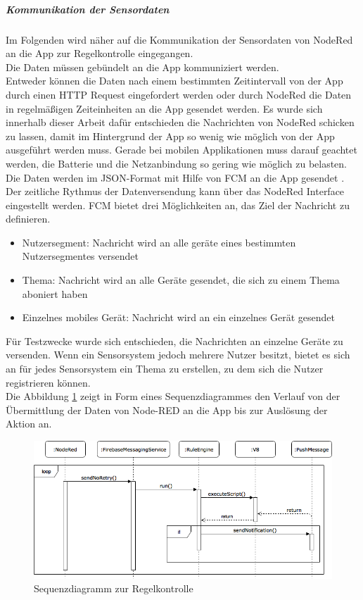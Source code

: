 \subparagraph{Kommunikation der Sensordaten}
Im Folgenden wird näher auf die Kommunikation der Sensordaten von NodeRed an die App zur Regelkontrolle eingegangen.\\
Die Daten müssen gebündelt an die App kommuniziert werden.\\
Entweder können die Daten nach einem bestimmten Zeitintervall von der App durch einen HTTP Request eingefordert werden oder durch NodeRed die Daten in regelmäßigen Zeiteinheiten an die App gesendet werden. Es wurde sich innerhalb dieser Arbeit dafür entschieden die Nachrichten von NodeRed schicken zu lassen, damit im Hintergrund der App so wenig wie möglich von der App ausgeführt werden muss. Gerade bei mobilen Applikationen muss darauf geachtet werden, die Batterie und die Netzanbindung so gering wie möglich zu belasten. \\
Die Daten werden im JSON-Format mit Hilfe von \ac{FCM} an die App gesendet \cite{firebase:gcm}. Der zeitliche Rythmus der Datenversendung kann über das NodeRed Interface eingestellt werden. \ac{FCM} bietet drei Möglichkeiten an, das Ziel der Nachricht zu definieren.
\begin{itemize}
	\item Nutzersegment: Nachricht wird an alle geräte eines bestimmten Nutzersegmentes versendet
	\item Thema: Nachricht wird an alle Geräte gesendet, die sich zu einem Thema aboniert haben
	\item Einzelnes mobiles Gerät: Nachricht wird an ein einzelnes Gerät gesendet
\end{itemize}
Für Testzwecke wurde sich entschieden, die Nachrichten an einzelne Geräte zu versenden. Wenn ein Sensorsystem jedoch mehrere Nutzer besitzt, bietet es sich an für jedes Sensorsystem ein Thema zu erstellen, zu dem sich die Nutzer registrieren können.\\
Die Abbildung \ref{fig:sequenzdiagramm} zeigt in Form eines Sequenzdiagrammes den Verlauf von der Übermittlung
der Daten von Node-RED an die App bis zur Auslösung der Aktion an.
\begin{figure}
	\centering
	\includegraphics[width=1\textwidth]{images/Sequenzdiagramm.png}
	\caption{Sequenzdiagramm zur Regelkontrolle}
	\label{fig:sequenzdiagramm}
\end{figure}

